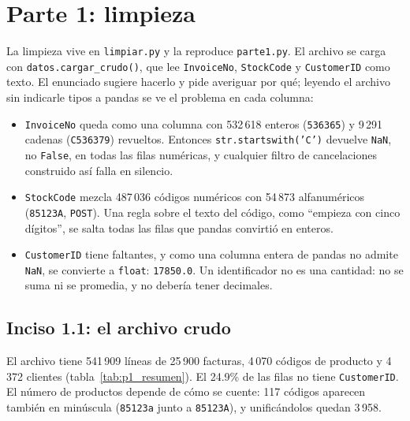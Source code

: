 \section{Parte 1: limpieza}
\label{sec:parte1}

La limpieza vive en \texttt{limpiar.py} y la reproduce \texttt{parte1.py}. El
archivo se carga con \texttt{datos.cargar\_crudo()}, que lee
\texttt{InvoiceNo}, \texttt{StockCode} y \texttt{CustomerID} como texto. El
enunciado sugiere hacerlo y pide averiguar por qué; leyendo el archivo sin
indicarle tipos a pandas se ve el problema en cada columna:
\begin{itemize}
  \item \texttt{InvoiceNo} queda como una columna con 532\,618 enteros
    (\texttt{536365}) y 9\,291 cadenas (\texttt{C536379}) revueltos. Entonces
    \texttt{str.startswith('C')} devuelve \texttt{NaN}, no \texttt{False}, en
    todas las filas numéricas, y cualquier filtro de cancelaciones construido
    así falla en silencio.
  \item \texttt{StockCode} mezcla 487\,036 códigos numéricos con 54\,873
    alfanuméricos (\texttt{85123A}, \texttt{POST}). Una regla sobre el texto
    del código, como ``empieza con cinco dígitos'', se salta todas las filas
    que pandas convirtió en enteros.
  \item \texttt{CustomerID} tiene faltantes, y como una columna entera de
    pandas no admite \texttt{NaN}, se convierte a \texttt{float}:
    \texttt{17850.0}. Un identificador no es una cantidad: no se suma ni se
    promedia, y no debería tener decimales.
\end{itemize}

\subsection{Inciso 1.1: el archivo crudo}

\begin{table}[H]
  \centering
  \small
  \caption{Tamaño del archivo original, antes de limpiar.}
  \label{tab:p1_resumen}
\end{table}

El archivo tiene 541\,909 líneas de 25\,900 facturas, 4\,070 códigos de
producto y 4\,372 clientes (tabla~\ref{tab:p1_resumen}). El 24.9\% de las
filas no tiene \texttt{CustomerID}. El número de productos depende de cómo se
cuente: 117 códigos aparecen también en minúscula (\texttt{85123a} junto a
\texttt{85123A}), y unificándolos quedan 3\,958.

